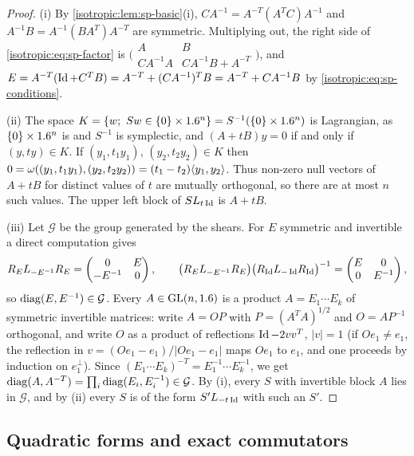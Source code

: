 \begin{proof}
(i) By \cref{isotropic:lem:sp-basic}(i),
$CA^{-1}=A^{-T}(A^TC)A^{-1}$ and $A^{-1}B=A^{-1}(BA^T)A^{-T}$ are symmetric.
Multiplying out, the right side of \eqref{isotropic:eq:sp-factor} is
$\bigl(\begin{smallmatrix}A&B\\CA^{-1}A&CA^{-1}B+A^{-T}\end{smallmatrix}\bigr)$,
and $E=A^{-T}(\operatorname{Id}+C^TB)=A^{-T}+(CA^{-1})^TB=A^{-T}+CA^{-1}B$ by
\eqref{isotropic:eq:sp-conditions}.

(ii) The space $K=\{w;\ Sw\in\{0\}\times\R^n\}=S^{-1}(\{0\}\times\R^n)$ is
Lagrangian, as $\{0\}\times1.6^n$ is and $S^{-1}$ is symplectic, and $(A+tB)y=0$
if and only if $(y,ty)\in K$. If $(y_1,t_1y_1)$, $(y_2,t_2y_2)\in K$ then
$0=\omega((y_1,t_1y_1),(y_2,t_2y_2))=(t_1-t_2)\langle y_1, y_2\rangle$. Thus non-zero
null vectors of $A+tB$ for distinct values of $t$ are mutually orthogonal, so
there are at most $n$ such values. The upper left block of $SL_{t\operatorname{Id}}$ is $A+tB$.

(iii) Let $\mathcal G$ be the group generated by the shears. For $E$
symmetric and invertible a direct computation gives
\begin{equation*}
  R_EL_{-E^{-1}}R_E=\begin{pmatrix}0&E\\-E^{-1}&0\end{pmatrix},\qquad
  \bigl(R_EL_{-E^{-1}}R_E\bigr)\bigl(R_{\operatorname{Id}}L_{-\operatorname{Id}}R_{\operatorname{Id}}\bigr)^{-1}
  =\begin{pmatrix}E&0\\0&E^{-1}\end{pmatrix},
\end{equation*}
so $\operatorname{diag}(E,E^{-1})\in\mathcal G$. Every $A\in\operatorname{GL}(n,1.6)$ is a product
$A=E_1\cdots E_k$ of symmetric invertible matrices: write $A=OP$ with
$P=(A^TA)^{1/2}$ and $O=AP^{-1}$ orthogonal, and write $O$ as a product of
reflections $\operatorname{Id}-2vv^T$, $|v|=1$ (if $Oe_1\ne e_1$, the reflection in
$v=(Oe_1-e_1)/|Oe_1-e_1|$ maps $Oe_1$ to $e_1$, and one proceeds by induction
on $e_1^\perp$). Since $(E_1\cdots E_k)^{-T}=E_1^{-1}\cdots E_k^{-1}$, we get
$\operatorname{diag}(A,A^{-T})=\prod_i\operatorname{diag}(E_i,E_i^{-1})\in\mathcal G$. By (i), every $S$
with invertible block $A$ lies in $\mathcal G$, and by (ii) every $S$ is of the
form $S'L_{-t\operatorname{Id}}$ with such an $S'$.
\end{proof}

\subsection{Quadratic forms and exact commutators}

